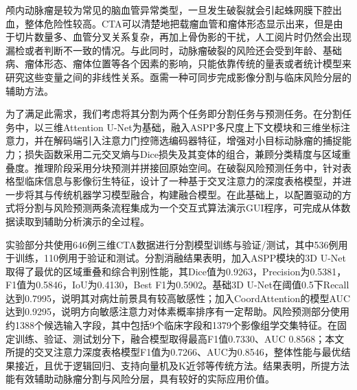 颅内动脉瘤是较为常见的脑血管异常类型，一旦发生破裂就会引起蛛网膜下腔出血，整体危险性较高。CTA可以清楚地把载瘤血管和瘤体形态显示出来，但是由于切片数量多、血管分叉关系复杂，再加上骨伪影的干扰，人工阅片时仍然会出现漏检或者判断不一致的情况。与此同时，动脉瘤破裂的风险还会受到年龄、基础病、瘤体形态、瘤体位置等各个因素的影响，只能依靠传统的量表或者统计模型来研究这些变量之间的非线性关系。亟需一种可同步完成影像分割与临床风险分层的辅助方法。

为了满足此需求，我们考虑将其分割为两个任务即分割任务与预测任务。在分割任务中，以三维Attention U-Net为基础，融入ASPP多尺度上下文模块和三维坐标注意力，并在解码端引入注意力门控筛选编码器特征，增强对小目标动脉瘤的捕捉能力；损失函数采用二元交叉熵与Dice损失及其变体的组合，兼顾分类精度与区域重叠度。推理阶段采用分块预测并拼接回原始空间。在破裂风险预测任务中，针对表格型临床信息与影像衍生特征，设计了一种基于交叉注意力的深度表格模型，并进一步将其与传统机器学习模型融合，构建融合模型。在此基础上，以配置驱动的方式将分割与风险预测两条流程集成为一个交互式算法演示GUI程序，可完成从体数据读取到辅助分析演示的全过程。

实验部分共使用646例三维CTA数据进行分割模型训练与验证/测试，其中536例用于训练，110例用于验证和测试。分割消融结果表明，加入ASPP模块的3D U-Net取得了最优的区域重叠和综合判别性能，其Dice值为0.9263，Precision为0.5381，F1值为0.5846，IoU为0.4130，Best F1为0.5902。基础3D U-Net在阈值0.5下Recall达到0.7995，说明其对病灶前景具有较高敏感性；加入CoordAttention的模型AUC达到0.9295，说明方向敏感注意力对体素概率排序有一定帮助。风险预测部分使用约1388个候选输入字段，其中包括9个临床字段和1379个影像组学交集特征。在固定训练、验证、测试划分下，融合模型取得最高F1值0.7330、AUC 0.8568；本文所提的交叉注意力深度表格模型F1值为0.7266、AUC为0.8546，整体性能与最优结果接近，且优于逻辑回归、支持向量机及K近邻等传统方法。结果表明，所提方法能有效辅助动脉瘤分割与风险分层，具有较好的实际应用价值。